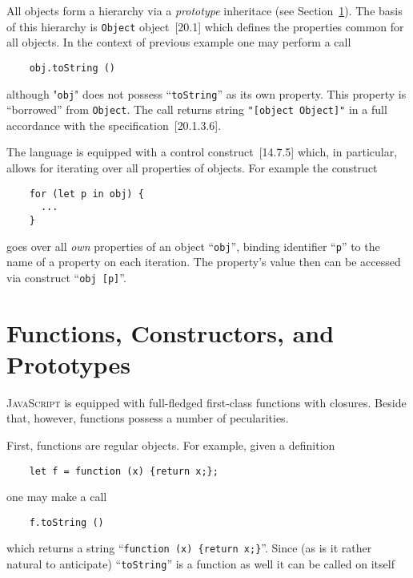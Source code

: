 \documentclass{article}
\newcommand{\js}{\textsc{JavaScript}\xspace}
\newcommand{\rf}[1]{[\textsc{#1}]}
\begin{document}
All objects form a hierarchy via a \emph{prototype} inheritace (see Section~\ref{sec:prototype}). The basis of
this hierarchy is \lstinline|Object| object~\rf{20.1} which defines the properties common for all objects.
In the context of previous example one may perform a call

\begin{lstlisting}
    obj.toString ()
\end{lstlisting}

although "\lstinline|obj|" does not possess ``\lstinline|toString|'' as its own property. This property is ``borrowed''
from \lstinline|Object|. The call returns string \lstinline|"[object Object]"| in a full accordance with the
specification~\rf{20.1.3.6}.

The language is equipped with a control construct~\rf{14.7.5} which, in particular, allows for iterating over
all properties of objects. For example the construct

\begin{lstlisting}
    for (let p in obj) {
      ...
    }
\end{lstlisting}

goes over all \emph{own} properties of an object ``\lstinline|obj|'', binding identifier ``\lstinline|p|'' to the
name of a property on each iteration. The property's value then can be accessed via construct ``\lstinline|obj [p]|''.

\section{Functions, Constructors, and Prototypes}
\label{sec:prototype}

\js is equipped with full-fledged first-class functions with closures. Beside that, however, functions possess a number of pecularities.

First, functions are regular objects. For example, given a definition

\begin{lstlisting}
    let f = function (x) {return x;};
\end{lstlisting}

one may make a call

\begin{lstlisting}
    f.toString ()
\end{lstlisting}

which returns a string ``\lstinline|function (x) {return x;}|''. Since (as is it rather natural to anticipate) ``\lstinline|toString|''
is a function as well it can be called on itself
\end{document}
